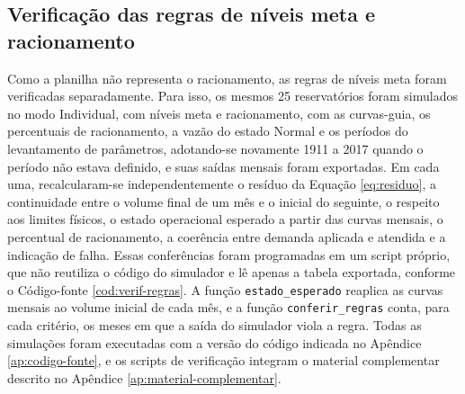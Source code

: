 \subsection{Verificação das regras de níveis meta e racionamento}
\label{subsec:metodo-verif-regras}

Como a planilha não representa o racionamento, as regras de níveis meta foram verificadas separadamente. Para isso, os mesmos 25 reservatórios foram simulados no modo Individual, com níveis meta e racionamento, com as curvas-guia, os percentuais de racionamento, a vazão do estado Normal e os períodos do levantamento de parâmetros, adotando-se novamente 1911 a 2017 quando o período não estava definido, e suas saídas mensais foram exportadas. Em cada uma, recalcularam-se independentemente o resíduo da Equação \ref{eq:residuo}, a continuidade entre o volume final de um mês e o inicial do seguinte, o respeito aos limites físicos, o estado operacional esperado a partir das curvas mensais, o percentual de racionamento, a coerência entre demanda aplicada e atendida e a indicação de falha. Essas conferências foram programadas em um script próprio, que não reutiliza o código do simulador e lê apenas a tabela exportada, conforme o Código-fonte \ref{cod:verif-regras}. A função \texttt{estado\_esperado} reaplica as curvas mensais ao volume inicial de cada mês, e a função \texttt{conferir\_regras} conta, para cada critério, os meses em que a saída do simulador viola a regra. Todas as simulações foram executadas com a versão do código indicada no Apêndice \ref{ap:codigo-fonte}, e os scripts de verificação integram o material complementar descrito no Apêndice \ref{ap:material-complementar}.

